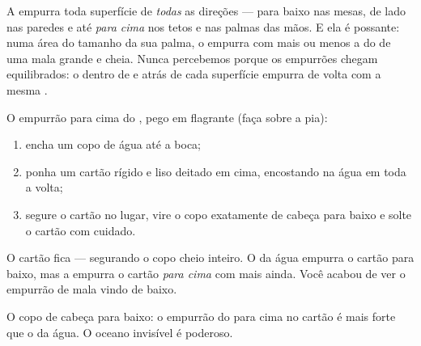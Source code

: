 \begin{proposition}\label{prop:g5:air-pressure-weather:allsides}
A  empurra toda superfície de \emph{todas} as
direções --- para baixo nas mesas, de lado nas paredes e até
\emph{para cima} nos tetos e nas palmas das mãos. E ela é possante:
numa área do tamanho da sua palma, o  empurra com mais ou menos a
 do  de uma mala grande e cheia. Nunca percebemos porque os
empurrões chegam equilibrados: o  dentro de  e atrás de cada
superfície empurra de volta com a mesma .
\end{proposition}

\begin{method}\label{met:g5:air-pressure-weather:card}
O empurrão para cima do , pego em flagrante (faça sobre a pia):
\begin{enumerate}
  \item encha um copo de água até a boca;
  \item ponha um cartão rígido e liso deitado em cima, encostando na
        água em toda a volta;
  \item segure o cartão no lugar, vire o copo exatamente de cabeça
        para baixo e solte o cartão com cuidado.
\end{enumerate}
O cartão fica --- segurando o copo cheio inteiro. O  da água
empurra o cartão para baixo, mas a  empurra o cartão
\emph{para cima} com mais  ainda. Você acabou de ver o empurrão
de mala vindo de baixo.
\end{method}

\begin{omfigure}

{\small O copo de cabeça para baixo: o empurrão do  para cima no
cartão é mais forte que o  da água. O oceano invisível é
poderoso.}
\end{omfigure}

